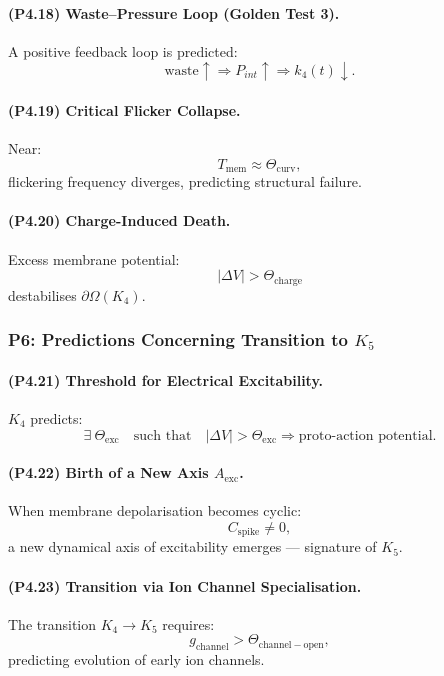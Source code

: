 \paragraph{(P4.18) Waste–Pressure Loop (Golden Test 3).}
A positive feedback loop is predicted:
\[
\text{waste} \uparrow \Rightarrow P_{int} \uparrow
\Rightarrow k_4(t) \downarrow.
\]

\paragraph{(P4.19) Critical Flicker Collapse.}
Near:
\[
T_{\mathrm{mem}} \approx \Theta_{\mathrm{curv}},
\]
flickering frequency diverges, predicting structural failure.

\paragraph{(P4.20) Charge-Induced Death.}
Excess membrane potential:
\[
|\Delta V| > \Theta_{\mathrm{charge}}
\]
destabilises $\partial\Omega(K_4)$.

\subsubsection{P6: Predictions Concerning Transition to \texorpdfstring{$K_5$}{K_5}}

\paragraph{(P4.21) Threshold for Electrical Excitability.}
$K_4$ predicts:
\[
\exists\ \Theta_{\mathrm{exc}} \quad \text{such that}\quad
|\Delta V| > \Theta_{\mathrm{exc}}
\Rightarrow \text{proto-action potential}.
\]

\paragraph{(P4.22) Birth of a New Axis $A_{\mathrm{exc}}$.}
When membrane depolarisation becomes cyclic:
\[
C_{\mathrm{spike}} \neq 0,
\]
a new dynamical axis of excitability emerges — signature of $K_5$.

\paragraph{(P4.23) Transition via Ion Channel Specialisation.}
The transition $K_4 \to K_5$ requires:
\[
g_{\mathrm{channel}} > \Theta_{\mathrm{channel-open}},
\]
predicting evolution of early ion channels.

